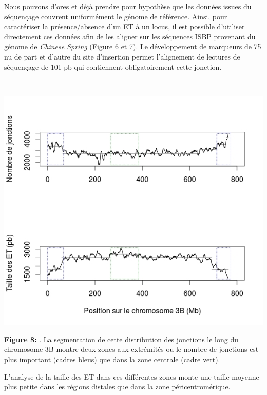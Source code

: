 \documentclass[a4paper, 12pt]{article}
\begin{document}
\begin{onehalfspace}
Nous pouvons d'ores et déjà prendre pour hypothèse que les données issues du séquençage couvrent uniformément le génome de référence. Ainsi, pour caractériser la présence/absence d'un ET à un locus, il est possible d'utiliser directement ces données afin de les aligner sur les séquences ISBP provenant du génome de \textit{Chinese Spring} (Figure 6 et 7). Le développement de marqueurs de 75 nu de part et d'autre du site d'insertion permet l'alignement de lectures de séquençage de 101 pb qui contiennent obligatoirement cette jonction.

\newpage
\thispagestyle{empty}
~ \vfill \vspace{-2cm}
\begin{multicols}{2}
\begin{center}
\includegraphics[scale=0.43]{pic_Data/fig7.jpeg}\\
\end{center}
\vspace{-0.3cm}
\textbf{Figure 8:} . La segmentation de cette distribution des jonctions le long du chromosome 3B montre deux zones aux extrémités ou le nombre de jonctions est plus important (cadres bleus) que dans la zone centrale (cadre vert). 

L'analyse de la taille des ET dans ces différentes zones monte une taille moyenne plus petite dans les régions distales que dans la zone péricentromérique. ~\\


\end{multicols}
\end{onehalfspace}
\end{document}
